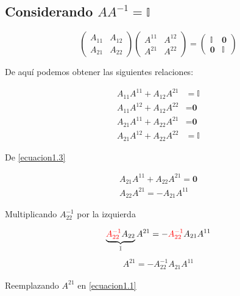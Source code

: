 \documentclass[12pt]{article}
\begin{document}
\subsection*{Considerando $AA^{-1} = \mathbb{I}$}

\begin{equation*}
    \begin{pmatrix} A_{11} & A_{12}\\ A_{21} & A_{22} \end{pmatrix}\begin{pmatrix} A^{11} & A^{12}\\ A^{21} & A^{22} \end{pmatrix} = \begin{pmatrix} \mathbb{I} & \textbf{0} \\ \textbf{0} & \mathbb{I} \end{pmatrix}
\end{equation*}

 De aquí podemos obtener las siguientes relaciones:

\begin{align}
    A_{11}A^{11} + A_{12}A^{21} &= \mathbb{I} \label{ecuacion1.1} \\ 
    A_{11}A^{12} + A_{12}A^{22} &= \textbf{0} \label{ecuacion1.2} \\ 
    A_{21}A^{11} + A_{22}A^{21} &= \textbf{0} \label{ecuacion1.3} \\ 
    A_{21}A^{12} + A_{22}A^{22} &= \mathbb{I} \label{ecuacion1.4}
\end{align}

De \eqref{ecuacion1.3}

\begin{align*}
    A_{21}A^{11} + A_{22}A^{21} = \textbf{0} \\
    A_{22}A^{21} = -A_{21}A^{11}
\end{align*}

Multiplicando \color{red} $A_{22}^{-1}$ \color{black} por la izquierda

\begin{align*}
    \underbrace{\color{red} A_{22}^{-1} \color{black}A_{22}}_{\mathbb{I}}A^{21} = -\color{red} A_{22}^{-1} \color{black}A_{21}A^{11}
\end{align*}
\begin{align} \label{ecuacion1.5}
    A^{21} = -A_{22}^{-1}A_{21}A^{11}
\end{align}

Reemplazando \color{red} $A^{21}$ \color{black} en \eqref{ecuacion1.1}
\end{document}
